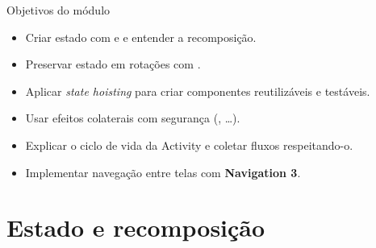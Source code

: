 \documentclass[aspectratio=169,10pt]{beamer}
\begin{document}
\capa

\begin{frame}{Objetivos do módulo}
  \begin{conceito}
    \begin{itemize}
      \item Criar estado com  e  e entender a recomposição.
      \item Preservar estado em rotações com .
      \item Aplicar \emph{state hoisting} para criar componentes reutilizáveis e testáveis.
      \item Usar efeitos colaterais com segurança (, \ldots).
      \item Explicar o ciclo de vida da Activity e coletar fluxos respeitando-o.
      \item Implementar navegação entre telas com \textbf{Navigation 3}.
    \end{itemize}
  \end{conceito}
\end{frame}

\sumario

\section{Estado e recomposição}
\end{document}
